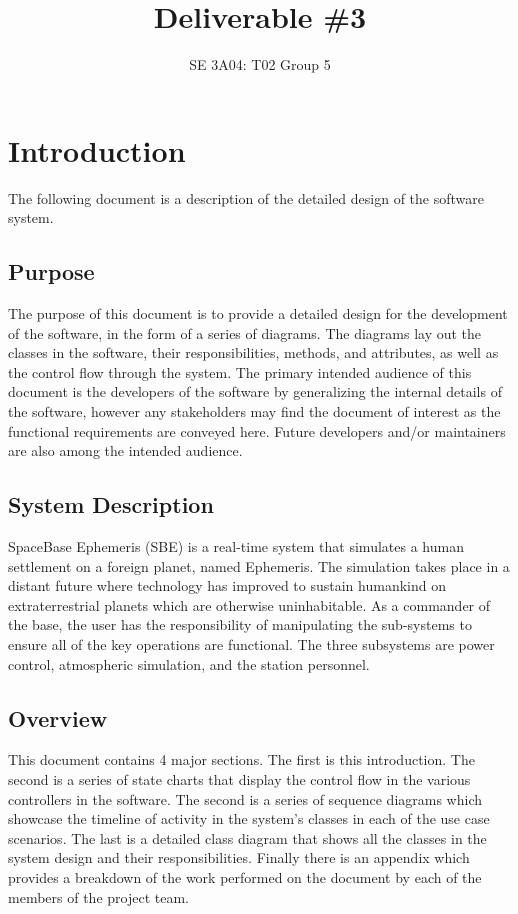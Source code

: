 \documentclass[]{article}
\title{Deliverable \#3}
\author{SE 3A04: T02 Group 5}
\date{}
\begin{document}
\maketitle	

\section{Introduction}
\label{sec:introduction}

The following document is a description of the detailed design of the software system. 

\subsection{Purpose}
\label{sub:purpose}
The purpose of this document is to provide a detailed design for the development of the software, in the form of a series of diagrams. The diagrams lay out the classes in the software, their responsibilities, methods, and attributes, as well as the control flow through the system. The primary intended audience of this document is the developers of the software by generalizing the internal details of the software, however any stakeholders may find the document of interest as the functional requirements are conveyed here. Future developers and/or maintainers are also among the intended audience.

\subsection{System Description}
\label{sub:system_description}
SpaceBase Ephemeris (SBE) is a real-time system that simulates a human settlement on a foreign planet, named Ephemeris.  The simulation takes place in a distant future where technology has improved to sustain humankind on extraterrestrial planets which are otherwise uninhabitable. As a commander of the base, the user has the responsibility of manipulating the sub-systems to ensure all of the key operations are functional. The three subsystems are power control, atmospheric simulation, and the station personnel.

\subsection{Overview}
\label{sub:overview}
This document contains 4 major sections. The first is this introduction. The second is a series of state charts that display the control flow in the various controllers in the software. The second is a series of sequence diagrams which showcase the timeline of activity in the system's classes in each of the use case scenarios. The last is a detailed class diagram that shows all the classes in the system design and their responsibilities. Finally there is an appendix which provides a breakdown of the work performed on the document by each of the members of the project team.
\end{document}
